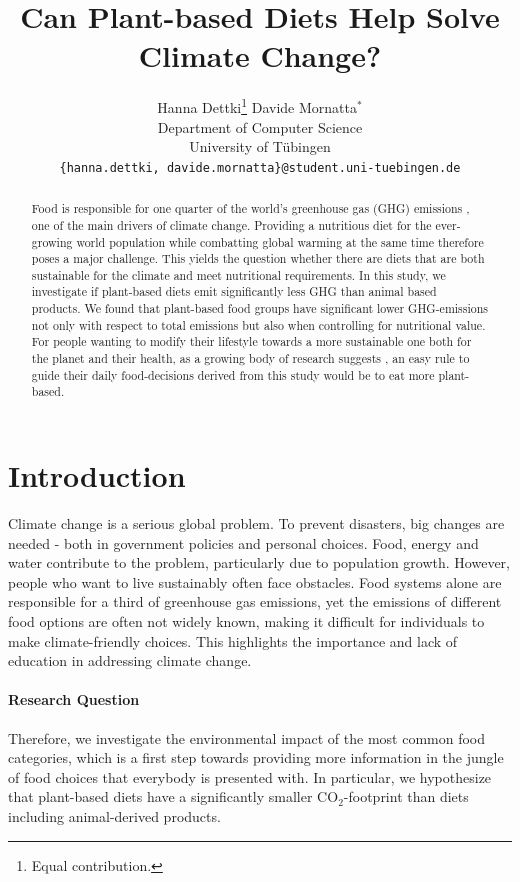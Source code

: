 \documentclass{article}
\title{Can Plant-based Diets Help Solve Climate Change?}
\author{%
  Hanna Dettki\thanks{Equal contribution.}\hspace{4em} Davide Mornatta$^{*}$  \\[0.5em]
  Department of Computer Science\\
  University of Tübingen\\
  \texttt{\{hanna.dettki, davide.mornatta\}@student.uni-tuebingen.de}
}
\begin{document}
\maketitle

\begin{abstract}
  Food is responsible for one quarter of the world's greenhouse gas (GHG) emissions \cite{Poore2018}, one of the main drivers of climate change. Providing a nutritious diet for the ever-growing world population while combatting global warming at the same time therefore poses a major challenge. This yields the question whether there are diets that are both sustainable for the climate and meet  nutritional requirements. In this study, we investigate if plant-based diets  emit significantly less GHG than animal based products. We found  that plant-based food groups have significant lower GHG-emissions not only with respect to total emissions but also when controlling for nutritional value. For people wanting to  modify their lifestyle towards a more sustainable one both for the planet and their health, as a growing body of research suggests \cite{WHO2021}, an easy rule to guide their daily food-decisions derived from this study would be to eat more plant-based.
\end{abstract}

\section{Introduction}

 Climate change is a serious global problem. To prevent disasters, big changes are needed - both in government policies and personal choices.\cite{IPCC}
Food, energy and water contribute to the problem, particularly due to population growth.\cite{Ritchie2020} However, people who want to live sustainably often face obstacles. Food systems alone are responsible for a third of greenhouse gas emissions\cite{Crippa2021}, yet the emissions of different food options are often not widely known, making it difficult for individuals to make climate-friendly choices. This highlights the importance and lack of education in addressing climate change.
\paragraph*{Research Question}
Therefore, we investigate the environmental impact of the most common food categories, which is a first step towards  providing more information in the jungle of food choices that everybody is presented with. In particular, we hypothesize that  plant-based diets  have a significantly smaller CO$_2$-footprint than  diets including animal-derived products. %
\end{document}
